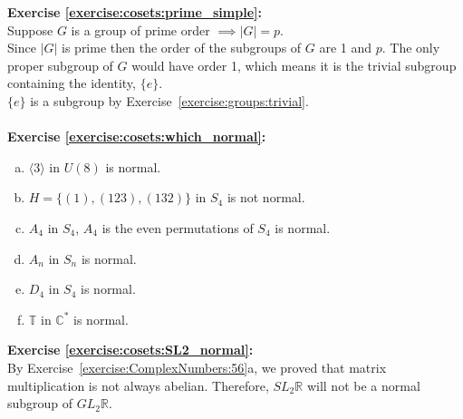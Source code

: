 \noindent\textbf{Exercise \ref{exercise:cosets:prime_simple}:}
\\
Suppose $G$ is a group of prime order $\implies |G| = p$.
\\
Since $|G|$ is prime then the order of the subgroups of $G$ are 1 and $p$.  The only proper subgroup of $G$ would have order 1, which means it is the trivial subgroup containing the identity, $\{e\}$.
\\
$\{e\}$ is a subgroup by Exercise~\ref{exercise:groups:trivial}.
\\
\\
\noindent\textbf{Exercise \ref{exercise:cosets:which_normal}:}
\begin{enumerate}[(a)]


\item
$\langle 3 \rangle$ in $U(8)$ is normal.


\item
$H = \{ (1), (123), (132) \}$ in $S_4$ is not normal.

\item
$A_4$ in $S_4$, $A_4$ is the even permutations of $S_4$ is normal.

\item
$A_n$ in $S_n$ is normal.

\item
$D_4$ in $S_4$ is normal.

\item
${\mathbb T}$ in ${\mathbb C}^\ast$ is normal.

\end{enumerate}


\noindent\textbf{Exercise \ref{exercise:cosets:SL2_normal}:}
\\
By Exercise~\ref{exercise:ComplexNumbers:56}a, we proved that matrix multiplication is not always abelian. Therefore, $SL_2{\mathbb R}$ will not be a normal subgroup of $GL_2{\mathbb R}$.

